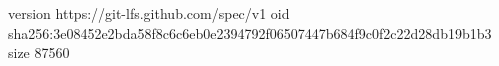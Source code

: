 version https://git-lfs.github.com/spec/v1
oid sha256:3e08452e2bda58f8c6c6eb0e2394792f06507447b684f9c0f2c22d28db19b1b3
size 87560

